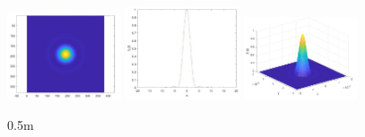 \documentclass[12pt,a4paper,UTF8]{ctexart}
\begin{document}
\begin{figure}[htbp]
	\centering
	\includegraphics[width=0.3\textwidth]{img//0.57.jpg}
	\includegraphics[width=0.3\textwidth]{img//0.58.jpg}
	\includegraphics[width=0.3\textwidth]{img//0.59.jpg}
	\caption{0.5m}
\end{figure}
\end{document}
